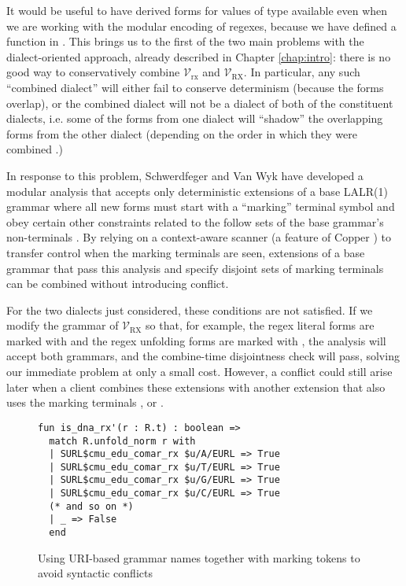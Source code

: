 {It would be useful to have derived forms for values of type  available even when we are working with the modular encoding of regexes, because we have defined a function  in . This brings us to the first of the two main problems with the dialect-oriented approach, already described in Chapter \ref{chap:intro}: there is no good way to conservatively combine $\mathcal{V}_\text{rx}$ and $\mathcal{V}_\text{RX}$. In particular, any such ``combined dialect'' will either fail to conserve determinism (because the forms overlap), or the combined dialect will not be a dialect of both of the constituent dialects, i.e. some of the forms from one dialect will ``shadow'' the overlapping forms from the other dialect (depending on the order in which they were combined \cite{Ford04a}.) 

In response to this problem, Schwerdfeger and Van Wyk have developed a modular analysis that accepts only deterministic extensions of a base LALR(1) grammar where all new forms must start with a ``marking'' terminal symbol and obey certain other constraints related to  the follow sets of the base grammar's non-terminals \cite{conf/pldi/SchwerdfegerW09,schwerdfeger2010context}. By relying on a context-aware scanner (a feature of Copper \cite{conf/gpce/WykS07}) to transfer control when the marking terminals are seen, extensions of a base grammar that pass this analysis and specify disjoint sets of marking terminals can be combined without introducing conflict. %

For the two dialects just considered, these conditions are not satisfied. If we modify the grammar of $\mathcal{V}_\text{RX}$ so that, for example, the regex literal forms are marked with  and the regex unfolding forms are marked with , the analysis will accept both grammars, and the combine-time disjointness check will pass, solving our immediate problem at only a small cost. However, a conflict could still  arise later when a client combines these extensions with another extension that also uses the marking terminals ,  or \li{/}. %

\begin{figure}
\begin{lstlisting}[numbers=none]
fun is_dna_rx'(r : R.t) : boolean => 
  match R.unfold_norm r with 
  | SURL$cmu_edu_comar_rx $u/A/EURL => True 
  | SURL$cmu_edu_comar_rx $u/T/EURL => True
  | SURL$cmu_edu_comar_rx $u/G/EURL => True
  | SURL$cmu_edu_comar_rx $u/C/EURL => True
  (* and so on *)
  | _ => False
  end
\end{lstlisting}
\vspace{-4px}
\caption{Using URI-based grammar names together with marking tokens to avoid syntactic conflicts}
\label{fig:vanwyk}
\vspace{-6px}
\end{figure}


}
